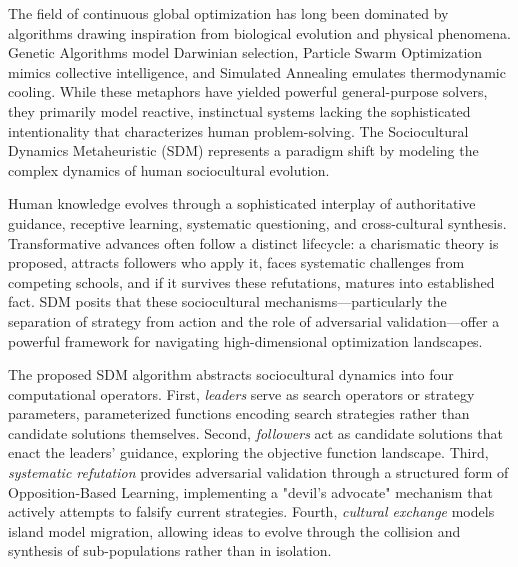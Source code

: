 \documentclass[11pt]{article}
\begin{document}

The field of continuous global optimization has long been dominated by algorithms drawing inspiration from biological evolution and physical phenomena. Genetic Algorithms model Darwinian selection, Particle Swarm Optimization mimics collective intelligence, and Simulated Annealing emulates thermodynamic cooling. While these metaphors have yielded powerful general-purpose solvers, they primarily model reactive, instinctual systems lacking the sophisticated intentionality that characterizes human problem-solving. The Sociocultural Dynamics Metaheuristic (SDM) represents a paradigm shift by modeling the complex dynamics of human sociocultural evolution.

Human knowledge evolves through a sophisticated interplay of authoritative guidance, receptive learning, systematic questioning, and cross-cultural synthesis. Transformative advances often follow a distinct lifecycle: a charismatic theory is proposed, attracts followers who apply it, faces systematic challenges from competing schools, and if it survives these refutations, matures into established fact. SDM posits that these sociocultural mechanisms—particularly the separation of strategy from action and the role of adversarial validation—offer a powerful framework for navigating high-dimensional optimization landscapes.


The proposed SDM algorithm abstracts sociocultural dynamics into four computational operators. First, \textit{leaders} serve as search operators or strategy parameters, parameterized functions encoding search strategies rather than candidate solutions themselves. Second, \textit{followers} act as candidate solutions that enact the leaders' guidance, exploring the objective function landscape. Third, \textit{systematic refutation} provides adversarial validation through a structured form of Opposition-Based Learning, implementing a "devil's advocate" mechanism that actively attempts to falsify current strategies. Fourth, \textit{cultural exchange} models island model migration, allowing ideas to evolve through the collision and synthesis of sub-populations rather than in isolation.
\end{document}
